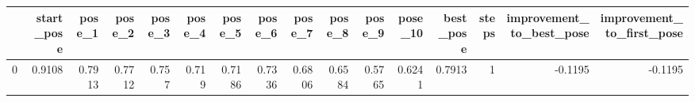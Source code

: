 \begin{tabular}{lrrrrrrrrrrrrrrr}
\toprule
{} &  start\_pose &  pose\_1 &  pose\_2 &  pose\_3 &  pose\_4 &  pose\_5 &  pose\_6 &  pose\_7 &  pose\_8 &  pose\_9 &  pose\_10 &  best\_pose &  steps &  improvement\_to\_best\_pose &  improvement\_to\_first\_pose \\
\midrule
0 &      0.9108 &  0.7913 &  0.7712 &   0.757 &   0.719 &  0.7186 &  0.7336 &  0.6806 &  0.6584 &  0.5765 &   0.6241 &     0.7913 &      1 &                   -0.1195 &                    -0.1195 \\
\bottomrule
\end{tabular}

